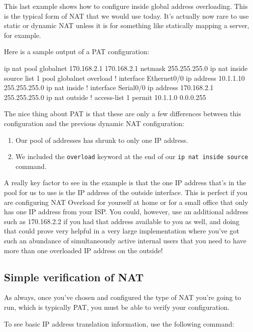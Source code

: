 This last example shows how to configure inside global address
overloading. This is the typical form of NAT that we would use today.
It's actually now rare to use static or dynamic NAT unless it is for
something like statically mapping a server, for example.

Here is a sample output of a PAT configuration:

\begin{cli}
ip nat pool globalnet 170.168.2.1 170.168.2.1 netmask 255.255.255.0
ip nat inside source list 1 pool globalnet overload
!
interface Ethernet0/0
 ip address 10.1.1.10 255.255.255.0
 ip nat inside
!
interface Serial0/0
 ip address 170.168.2.1 255.255.255.0
 ip nat outside
!
access-list 1 permit 10.1.1.0 0.0.0.255
\end{cli}

The nice thing about
PAT is that these are only a few differences between this configuration
and the previous dynamic NAT configuration:

\begin{enumerate}
\item
  Our pool of addresses has shrunk to only one IP address.
\item
  We included the \texttt{overload} keyword at the end of our
  \texttt{ip\ nat\ inside\ source} command.
\end{enumerate}

A really key factor to see in the example is that the one IP address
that's in the pool for us to use is the IP address of the outside
interface. This is perfect if you are configuring NAT Overload for
yourself at home or for a small office that only has one IP address from
your ISP. You could, however, use an additional address such as
170.168.2.2 if you had that address available to you as well, and doing
that could prove very helpful in a very large implementation where
you've got such an abundance of simultaneously active internal users
that you need to have more than one overloaded IP address on the
outside!




\subsection{Simple verification of NAT}

As always, once you've chosen and configured the type of NAT you're
going to run, which is typically PAT, you must be able to verify your
configuration.

To see basic IP address translation information, use the following
command:

